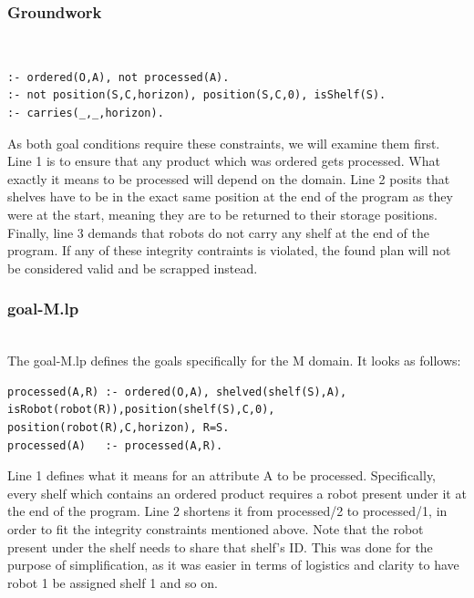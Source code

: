 \documentclass{llncs}
\begin{document}
\subsubsection{Groundwork}\hfill\\
\begin{lstlisting}[basicstyle=\fontsize{9}{11}\selectfont\ttfamily,frame=single,breaklines=true]
:- ordered(O,A), not processed(A).
:- not position(S,C,horizon), position(S,C,0), isShelf(S).
:- carries(_,_,horizon).
\end{lstlisting}
As both goal conditions require these constraints, we will examine them first. Line 1 is to ensure that any product which was ordered gets processed. What exactly it means to be processed will depend on the domain. Line 2 posits that shelves have to be in the exact same position at the end of the program as they were at the start, meaning they are to be returned to their storage positions. Finally, line 3  demands that robots do not carry any shelf at the end of the program. If any of these integrity contraints is violated, the found plan will not be considered valid and be scrapped instead.
\subsubsection{goal-M.lp}\hfill\\
The goal-M.lp defines the goals specifically for the M domain. It looks as follows:
\begin{lstlisting}[basicstyle=\fontsize{9}{11}\selectfont\ttfamily,frame=single,breaklines=true]
processed(A,R) :- ordered(O,A), shelved(shelf(S),A), isRobot(robot(R)),position(shelf(S),C,0), position(robot(R),C,horizon), R=S.
processed(A)   :- processed(A,R).
\end{lstlisting}
Line 1 defines what it means for an attribute A to be processed. Specifically, every shelf which contains an ordered product requires a robot present under it at the end of the program. Line 2 shortens it from processed/2 to processed/1, in order to fit the integrity constraints mentioned above. Note that the robot present under the shelf needs to share that shelf's ID. This was done for the purpose of simplification, as it was easier in terms of logistics and clarity to have robot 1 be assigned shelf 1 and so on.
\end{document}
